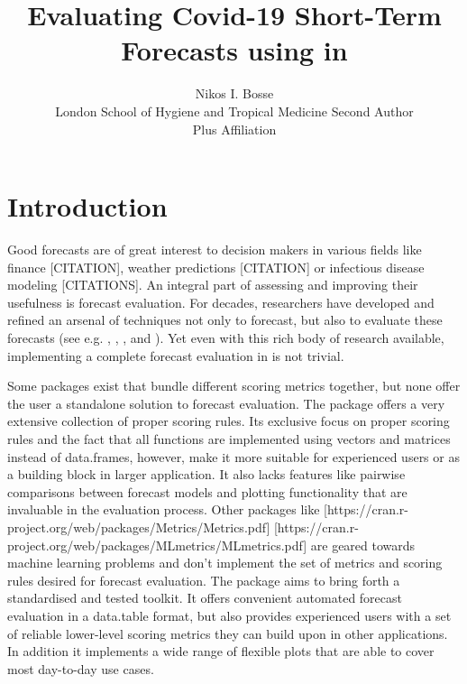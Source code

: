 \documentclass[article,shortnames]{jss}\usepackage[]{graphicx}\usepackage[]{color}
\author{Nikos I. Bosse\\London School of Hygiene and Tropical Medicine
   \And Second Author\\Plus Affiliation}
\title{Evaluating Covid-19 Short-Term Forecasts using \pkg{scoringutils} in \proglang{R}}
\begin{document}


\section[Introduction]{Introduction}
Good forecasts are of great interest to decision makers in various fields like finance \citep{timmermannForecastingMethodsFinance2018} [CITATION], weather predictions [CITATION] or infectious disease modeling \citep{funkShorttermForecastsInform2020} [CITATIONS]. An integral part of assessing and improving their usefulness is forecast evaluation. For decades, researchers have developed and refined an arsenal of techniques not only to forecast, but also to evaluate these forecasts (see e.g. \cite{bracherEvaluatingEpidemicForecasts2021}, \cite{funkAssessingPerformanceRealtime2019}, \cite{gneitingProbabilisticForecastsCalibration2007}, and \cite{gneitingStrictlyProperScoring2007}). Yet even with this rich body of research available, implementing a complete forecast evaluation in  is not trivial. 

Some packages exist that bundle different scoring metrics together, but none offer the user a standalone solution to forecast evaluation. The  package \citep{scoringRules} offers a very extensive collection of proper scoring rules. Its exclusive focus on proper scoring rules and the fact that all functions are implemented using vectors and matrices instead of data.frames, however, make it more suitable for experienced users or as a building block in larger application. It also lacks features like pairwise comparisons between forecast models and plotting functionality that are invaluable in the evaluation process. Other packages like  [https://cran.r-project.org/web/packages/Metrics/Metrics.pdf]  [https://cran.r-project.org/web/packages/MLmetrics/MLmetrics.pdf] are geared towards machine learning problems and don't implement the set of metrics and scoring rules desired for forecast evaluation. The  package aims to bring forth a standardised and tested toolkit. It offers convenient automated forecast evaluation in a data.table format, but also provides experienced users with a set of reliable lower-level scoring metrics they can build upon in other applications. In addition it implements a wide range of flexible plots that are able to cover most day-to-day use cases. 
\end{document}
